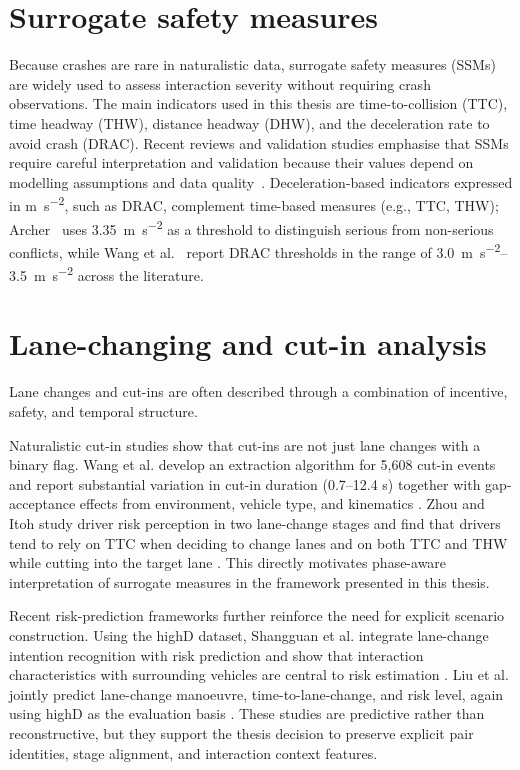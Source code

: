 \documentclass[12pt,a4paper,twoside,openright]{report}
\begin{document}
    \section{Surrogate safety measures}
    Because crashes are rare in naturalistic data, surrogate safety measures (SSMs) are widely used to assess interaction severity without requiring crash observations. The main indicators used in this thesis are time-to-collision (TTC), time headway (THW), distance headway (DHW), and the deceleration rate to avoid crash (DRAC). Recent reviews and validation studies emphasise that SSMs require careful interpretation and validation because their values depend on modelling assumptions and data quality~\cite{wang2021ssm,johnsson2021validation}. Deceleration-based indicators expressed in \si{\meter\per\second\squared}, such as DRAC, complement time-based measures (e.g., TTC, THW); Archer~\cite{archer2005indicators} uses \SI{3.35}{\meter\per\second\squared} as a threshold to distinguish serious from non-serious conflicts, while Wang et al.~\cite{wang2021ssm} report DRAC thresholds in the range of \SIrange{3.0}{3.5}{\meter\per\second\squared} across the literature.

    \section{Lane-changing and cut-in analysis}
    Lane changes and cut-ins are often described through a combination of incentive, safety, and temporal structure.

    Naturalistic cut-in studies show that cut-ins are not just lane changes with a binary flag. Wang et al. develop an extraction algorithm for 5,608 cut-in events and report substantial variation in cut-in duration (0.7--12.4 s) together with gap-acceptance effects from environment, vehicle type, and kinematics \cite{wang2019cutin}. Zhou and Itoh study driver risk perception in two lane-change stages and find that drivers tend to rely on TTC when deciding to change lanes and on both TTC and THW while cutting into the target lane \cite{zhou2016riskperception}. This directly motivates phase-aware interpretation of surrogate measures in the framework presented in this thesis.

    Recent risk-prediction frameworks further reinforce the need for explicit scenario construction. Using the highD dataset, Shangguan et al. integrate lane-change intention recognition with risk prediction and show that interaction characteristics with surrounding vehicles are central to risk estimation \cite{shangguan2022}. Liu et al. jointly predict lane-change manoeuvre, time-to-lane-change, and risk level, again using highD as the evaluation basis \cite{liu2025multitask}. These studies are predictive rather than reconstructive, but they support the thesis decision to preserve explicit pair identities, stage alignment, and interaction context features.
\end{document}
